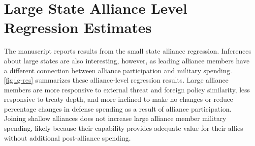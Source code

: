 \documentclass[12pt]{article}
\begin{document}
%


\section{Large State Alliance Level Regression Estimates} 

The manuscript reports results from the small state alliance regression. 
Inferences about large states are also interesting, however, as leading alliance members have a different connection between alliance participation and military spending.
\autoref{fig:lg-res} summarizes these alliance-level regression results.   
Large alliance members are more responsive to external threat and foreign policy similarity, less responsive to treaty depth, and more inclined to make no changes or reduce percentage changes in defense spending as a result of alliance participation.
Joining shallow alliances does not increase large alliance member military spending, likely because their capability provides adequate value for their allies without additional post-alliance spending. 
\end{document}
